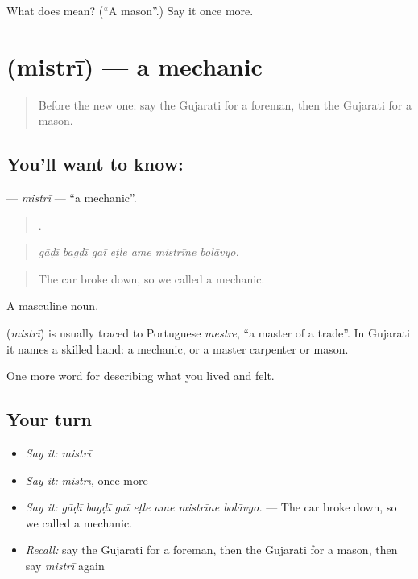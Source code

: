 \begin{tcolorbox}[breakable,colback=teal!4,colframe=teal!35!black,title={Before you move on}]
What does  mean? (\textquotedblleft{}A mason\textquotedblright{}.) Say it once more.
\end{tcolorbox}
\section[\texorpdfstring{\gu{મિસ્ત્રી} (mistrī)}{મિસ્ત્રી (mistrī)}]{ (mistrī) — a mechanic}

\label{lesson:GU-C511-mistri}



\begin{quote}
Before the new one: say the Gujarati for a foreman, then the Gujarati for a mason.
\end{quote}

\subsection*{You'll want to know: }
\textbf{} — \emph{mistrī} — \textquotedblleft{}a mechanic\textquotedblright{}.

\begin{quote}
      .
\end{quote}

\begin{quote}
\emph{gāḍī bagḍī gaī eṭle ame mistrīne bolāvyo.}
\end{quote}

\begin{quote}
The car broke down, so we called a mechanic.
\end{quote}

A masculine noun.

\begin{cousinweb}
\textbf{} (\emph{mistrī}) is usually traced to Portuguese \emph{mestre}, \textquotedblleft{}a master of a trade\textquotedblright{}. In Gujarati it names a skilled hand: a mechanic, or a master carpenter or mason.
\end{cousinweb}

\begin{grammarlens}[title={What you've built}]
One more word for describing what you lived and felt.
\end{grammarlens}

\subsection*{Your turn}
\begin{itemize}
\raggedright
  \item \emph{Say it:} \emph{mistrī}
  \item \emph{Say it:} \emph{mistrī}, once more
  \item \emph{Say it:} \emph{gāḍī bagḍī gaī eṭle ame mistrīne bolāvyo.} — The car broke down, so we called a mechanic.
  \item \emph{Recall:} say the Gujarati for a foreman, then the Gujarati for a mason, then say \emph{mistrī} again
\end{itemize}

